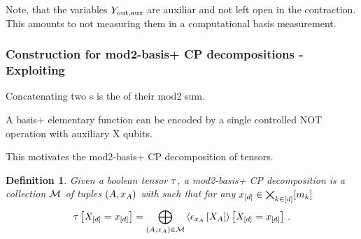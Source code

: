 \documentclass[aps,onecolumn,nofootinbib,pra]{article}
\newtheorem{lemma}{Lemma}
\newtheorem{definition}{Definition}
\begin{document}

    Note, that the variables $Y_{\mathrm{out},\mathrm{aux}}$ are auxiliar and not left open in the contraction.
    This amounts to not measuring them in a computational basis measurement.

    \subsubsection{Construction for mod2-basis+ CP decompositions - Exploiting \PolynomialSparsity{}}

    Concatenating two \computationCircuit{}s is the \computationCircuit{} of their mod2 sum.

    A basis+ elementary function can be encoded by a single controlled NOT operation with auxiliary X qubits.

    This motivates the mod2-basis+ CP decomposition of tensors.

    \begin{definition}
        Given a boolean tensor $\tau$, a mod2-basis+ CP decomposition is a collection $\mathcal{M}$ of tuples $(A,x_{A})$ with such that for any $x_{[d]}\in\bigtimes_{k\in[d]}[m_{k}]$
        \begin{align*}
            \tau\left[X_{[d]}=x_{[d]}\right]
            = \bigoplus_{(A,x_{A})\in\mathcal{M}} \left\langle \epsilon_{x_{A}}\left[X_{A}\right]\right\rangle \left[ X_{[d]}=x_{[d]} \right] \, .
        \end{align*}
    \end{definition}
\end{document}
